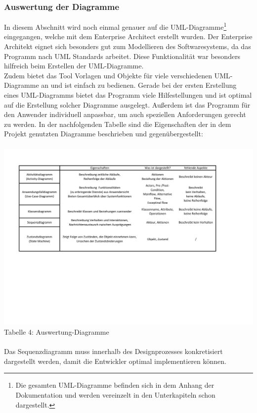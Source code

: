 \documentclass[12pt,a4paper]{article}
\begin{document}
\subsubsection*{Auswertung der Diagramme}
In diesem Abschnitt wird noch einmal genauer auf die UML-Diagramme\footnote{Die gesamten UML-Diagramme befinden sich in dem Anhang der Dokumentation und werden vereinzelt in den Unterkapiteln schon dargestellt.} eingegangen, welche mit dem Enterprise Architect erstellt wurden. Der Enterprise Architekt eignet sich besonders gut zum Modellieren des Softwaresystems, da das Programm nach UML Standards arbeitet. Diese Funktionalität war besonders hilfreich beim Erstellen der UML-Diagramme. 
\\
Zudem bietet das Tool Vorlagen und Objekte für viele verschiedenen UML-Diagramme an und ist einfach zu bedienen. Gerade bei der ersten Erstellung eines UML-Diagramms bietet das Programm viele Hilfestellungen und ist optimal auf die Erstellung solcher Diagramme ausgelegt. Außerdem ist das Programm für den Anwender individuell anpassbar, um auch speziellen Anforderungen gerecht zu werden.
In der nachfolgenden Tabelle sind die Eigenschaften der in dem Projekt  genutzten Diagramme beschrieben und gegenübergestellt:
\\
\\
\hspace*{-10mm} 
\includegraphics[trim = 10mm 60mm 0mm 20mm,clip,scale=0.7]{Auswertung_Diagramme.pdf}
\footnotesize Tabelle 4: Auswertung-Diagramme
\normalsize
\\
\\
Das Sequenzdiagramm muss innerhalb des Designprozesses konkretisiert dargestellt werden, damit die Entwickler optimal implementieren können.
\end{document}
